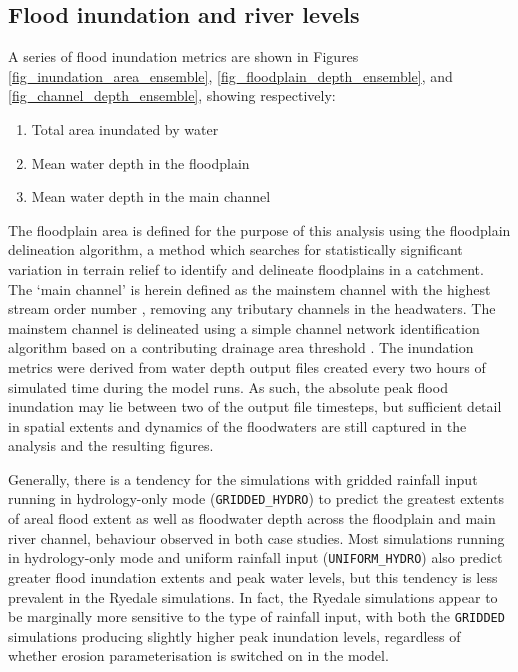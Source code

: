 \subsection{Flood inundation and river levels}
A series of flood inundation metrics are shown in Figures \ref{fig_inundation_area_ensemble}, \ref{fig_floodplain_depth_ensemble}, and \ref{fig_channel_depth_ensemble}, showing respectively:

\begin{enumerate}
\item Total area inundated by water
\item Mean water depth in the floodplain
\item Mean water depth in the main channel
\end{enumerate}

The floodplain area is defined for the purpose of this analysis using the \citet{clubbinpress} floodplain delineation algorithm, a method which searches for statistically significant variation in terrain relief to identify and delineate floodplains in a catchment. The `main channel' is herein defined as the mainstem channel with the highest stream order number \citep{strahler1957quantitative}, removing any tributary channels in the headwaters. The mainstem channel is delineated using a simple channel network identification algorithm based on a contributing drainage area threshold \citep{ocallaghan1984extraction,tarboton1991extraction}. The inundation metrics were derived from water depth output files created every two hours of simulated time during the model runs. As such, the absolute peak flood inundation may lie between two of the output file timesteps, but sufficient detail in spatial extents and dynamics of  the floodwaters are still captured in the analysis and the resulting figures. 

Generally, there is a tendency for the simulations with gridded rainfall input  running in hydrology-only mode (\texttt{GRIDDED\_HYDRO}) to predict the greatest extents of areal flood extent as well as floodwater depth across the floodplain and main river channel, behaviour observed in both case studies. Most simulations running in hydrology-only mode and uniform rainfall input (\texttt{UNIFORM\_HYDRO}) also predict greater flood inundation extents and peak water levels, but this tendency is less prevalent in the Ryedale simulations. In fact, the Ryedale simulations appear to be marginally more sensitive to the type of rainfall input, with both the \texttt{GRIDDED} simulations producing slightly higher peak inundation levels, regardless of whether erosion parameterisation is switched on in the model.

